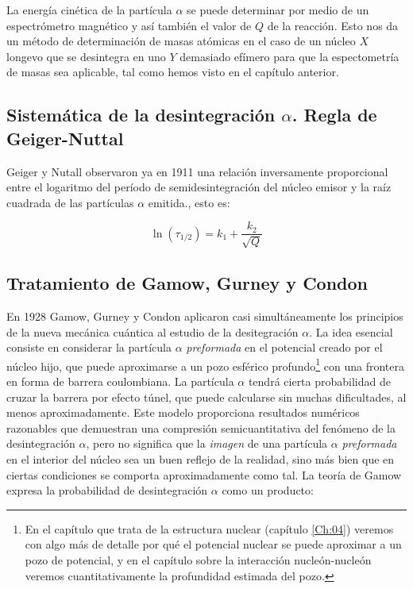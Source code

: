 La energía cinética de la partícula $\alpha$ se puede determinar por medio de un espectrómetro magnético y así también el valor de $Q$ de la reacción. Esto nos da un método de determinación de masas atómicas en el caso de un núcleo $X$ longevo que se desintegra en uno $Y$ demasiado efímero para que la espectometría de masas sea aplicable, tal como hemos visto en el capítulo anterior.

\subsection{Sistemática de la desintegración $\alpha$. Regla de Geiger-Nuttal}

Geiger y Nutall observaron ya en 1911 una relación inversamente proporcional entre el logaritmo del período de semidesintegración del núcleo emisor y la raíz cuadrada de las partículas $\alpha$ emitida., esto es:

\begin{mybox}
\begin{equation}
\ln (\tau_{1/2}) = k_1 + \frac{k_2}{\sqrt{Q}}
\end{equation}
\end{mybox}

\subsection{Tratamiento de Gamow, Gurney y Condon}

En 1928 Gamow, Gurney y Condon aplicaron casi simultáneamente los principios de la nueva mecánica cuántica al estudio de la desitegración $\alpha$. La idea esencial consiste en considerar la partícula $\alpha$ \textit{preformada} en el potencial creado por el núcleo hijo, que puede aproximarse a un pozo esférico profundo\footnote{En el capítulo que trata de la estructura nuclear (capítulo \ref{Ch:04}) veremos con algo más de detalle por qué el potencial nuclear se puede aproximar a un pozo de potencial, y en el capítulo sobre la interacción nucleón-nucleón veremos cuantitativamente la profundidad estimada del pozo.} con una frontera en forma de barrera coulombiana. La partícula $\alpha$ tendrá cierta probabilidad de cruzar la barrera por efecto túnel, que puede calcularse sin muchas dificultades, al menos aproximadamente. Este modelo proporciona resultados numéricos razonables que demuestran una compresión semicuantitativa del fenómeno de la desintegración $\alpha$, pero no significa que la \textit{imagen} de una partícula $\alpha$ \textit{preformada} en el interior del núcleo sea un buen reflejo de la realidad, sino más bien que en ciertas condiciones se comporta aproximadamente como tal. La teoría de Gamow expresa la probabilidad de desintegración $\alpha$ como un producto:

